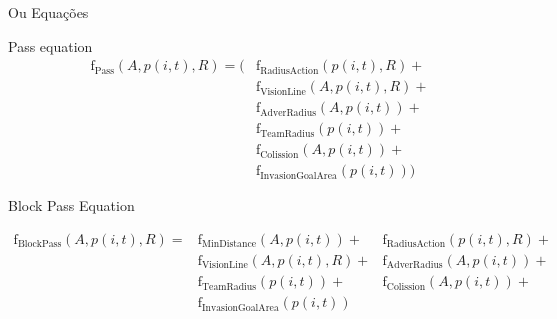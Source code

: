 \documentclass[xcolor=svgnames,8pt]{beamer}
\begin{document}
    \begin{frame}{Ou Equações}
        
        \begin{block}{Pass equation}
            \begin{equation*}\label{eq:f_pass_geral}
            \begin{aligned}
            \operatorname{f_{Pass}}(A, p(i,t), R) = (
            &\operatorname{f_{RadiusAction}}(p(i,t), R) + \\
            &\operatorname{f_{VisionLine}}(A,p(i,t),R)  + \\
            &\operatorname{f_{AdverRadius}}(A,p(i,t))   + \\
            &\operatorname{f_{TeamRadius}}(p(i,t))      +\\
            &\operatorname{f_{Colission}}(A, p(i,t))    + \\
            &\operatorname{f_{InvasionGoalArea}}(p(i,t))
            )
            \end{aligned}
            \end{equation*}
        \end{block}
        
        
        \begin{block}{Block Pass Equation}
    
            \begin{equation*}\label{eq:f_block_pass_geral}
                \begin{aligned}
                \operatorname{f_{BlockPass}}(A, p(i,t), R) =& \operatorname{f_{MinDistance}}(A, p(i,t))
                 +&\operatorname{f_{RadiusAction}}(p(i,t), R) + 
                \\
                & \operatorname{f_{VisionLine}}(A,p(i,t),R) + 
                &\operatorname{f_{AdverRadius}}(A,p(i,t)) + 
                \\
                & \operatorname{f_{TeamRadius}}(p(i,t)) +
                 & \operatorname{f_{Colission}}(A, p(i,t)) + 
                 \\
                & \operatorname{f_{InvasionGoalArea}}(p(i,t))
                \end{aligned}
                \end{equation*}
    
        \end{block}
    \end{frame}
\end{document}
